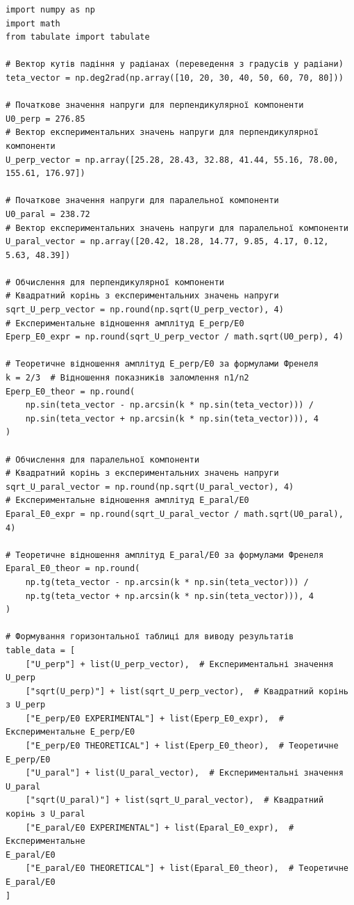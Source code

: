 \documentclass[12pt,a4paper]{article}
\begin{document}
      \small{ 

  \begin{verbatim}
import numpy as np
import math
from tabulate import tabulate

# Вектор кутів падіння у радіанах (переведення з градусів у радіани)
teta_vector = np.deg2rad(np.array([10, 20, 30, 40, 50, 60, 70, 80]))

# Початкове значення напруги для перпендикулярної компоненти
U0_perp = 276.85
# Вектор експериментальних значень напруги для перпендикулярної компоненти
U_perp_vector = np.array([25.28, 28.43, 32.88, 41.44, 55.16, 78.00, 155.61, 176.97])

# Початкове значення напруги для паралельної компоненти
U0_paral = 238.72
# Вектор експериментальних значень напруги для паралельної компоненти
U_paral_vector = np.array([20.42, 18.28, 14.77, 9.85, 4.17, 0.12, 5.63, 48.39])

# Обчислення для перпендикулярної компоненти
# Квадратний корінь з експериментальних значень напруги
sqrt_U_perp_vector = np.round(np.sqrt(U_perp_vector), 4)
# Експериментальне відношення амплітуд E_perp/E0
Eperp_E0_expr = np.round(sqrt_U_perp_vector / math.sqrt(U0_perp), 4)

# Теоретичне відношення амплітуд E_perp/E0 за формулами Френеля
k = 2/3  # Відношення показників заломлення n1/n2
Eperp_E0_theor = np.round(
    np.sin(teta_vector - np.arcsin(k * np.sin(teta_vector))) /
    np.sin(teta_vector + np.arcsin(k * np.sin(teta_vector))), 4
)

# Обчислення для паралельної компоненти
# Квадратний корінь з експериментальних значень напруги
sqrt_U_paral_vector = np.round(np.sqrt(U_paral_vector), 4)
# Експериментальне відношення амплітуд E_paral/E0
Eparal_E0_expr = np.round(sqrt_U_paral_vector / math.sqrt(U0_paral), 4)

# Теоретичне відношення амплітуд E_paral/E0 за формулами Френеля
Eparal_E0_theor = np.round(
    np.tg(teta_vector - np.arcsin(k * np.sin(teta_vector))) /
    np.tg(teta_vector + np.arcsin(k * np.sin(teta_vector))), 4
)

# Формування горизонтальної таблиці для виводу результатів
table_data = [
    ["U_perp"] + list(U_perp_vector),  # Експериментальні значення U_perp
    ["sqrt(U_perp)"] + list(sqrt_U_perp_vector),  # Квадратний корінь з U_perp
    ["E_perp/E0 EXPERIMENTAL"] + list(Eperp_E0_expr),  # Експериментальне E_perp/E0
    ["E_perp/E0 THEORETICAL"] + list(Eperp_E0_theor),  # Теоретичне E_perp/E0
    ["U_paral"] + list(U_paral_vector),  # Експериментальні значення U_paral
    ["sqrt(U_paral)"] + list(sqrt_U_paral_vector),  # Квадратний корінь з U_paral
    ["E_paral/E0 EXPERIMENTAL"] + list(Eparal_E0_expr),  # Експериментальне
E_paral/E0
    ["E_paral/E0 THEORETICAL"] + list(Eparal_E0_theor),  # Теоретичне E_paral/E0
]


\end{verbatim}}
\end{document}
